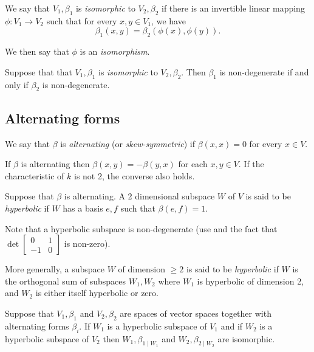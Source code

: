 \documentclass[11pt]{article}
\numberwithin{equation}{section}
\begin{document}
We say that \(V_1,\beta_1\) is \emph{isomorphic} to \(V_2,\beta_2\) if
there is an invertible linear mapping \(\phi:V_1 \to V_2\) such that
for every \(x,y \in V_1\), we have \[\beta_1(x,y) =
\beta_2(\phi(x),\phi(y)).\]

We then say that \(\phi\) is an \emph{isomorphism}.

\begin{lemma}
Suppose that that \(V_1,\beta_1\) is \emph{isomorphic} to \(V_2,\beta_2\).
Then \(\beta_1\) is non-degenerate if and only if \(\beta_2\) is
non-degenerate.
\label{lemma:isomorphism-preserves-nondegen}
\end{lemma}
\subsection{Alternating forms}
\label{sec:alternating-forms}
We say that \(\beta\) is \emph{alternating} (or \emph{skew-symmetric}) if
\(\beta(x,x) = 0\) for every \(x \in V\).

\begin{lemma}
If \(\beta\) is alternating then \(\beta(x,y) = -\beta(y,x)\) for each
\(x,y \in V\). If the characteristic of \(k\) is not 2, the converse
also holds.
\label{lemma:alt-skew}
\end{lemma}

Suppose that \(\beta\) is alternating.
A 2 dimensional subspace \(W\) of \(V\) is said to be \emph{hyperbolic} if \(W\) has a basis
\(e,f\) such that \(\beta(e,f) = 1\).

Note that a hyperbolic subspace is non-degenerate (use
 and the fact that \(\det \begin{bmatrix}
0 & 1 \\ -1 & 0 \end{bmatrix}\) is non-zero).

More generally, a subspace \(W\) of dimension \(\ge 2\) is said to be
\emph{hyperbolic} if \(W\) is the orthogonal sum of subspaces \(W_1,W_2\)
where \(W_1\) is hyperbolic of dimension 2, and \(W_2\) is either
itself hyperbolic or zero.

\begin{lemma}
Suppose that \(V_1,\beta_1\) and \(V_2,\beta_2\) are spaces of vector
spaces together with alternating forms \(\beta_i\). If \(W_1\) is a
hyperbolic subspace of \(V_1\) and if \(W_2\) is a hyperbolic subspace
of \(V_2\) then \(W_1,\beta_{1\mid W_1}\) and \(W_2,\beta_{2\mid W_2}\)
are isomorphic.
\label{lemma:hyperbolic-equiv}
\end{lemma}
\end{document}
